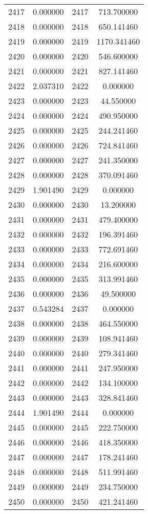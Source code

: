 \documentclass[12pt]{article}
\begin{document}
\begin{longtable}{@{}cccc@{}}
2417 & 0.000000 & 2417 & 713.700000 \\
2418 & 0.000000 & 2418 & 650.141460 \\
2419 & 0.000000 & 2419 & 1170.341460 \\
2420 & 0.000000 & 2420 & 546.600000 \\
2421 & 0.000000 & 2421 & 827.141460 \\
2422 & 2.037310 & 2422 & 0.000000 \\
2423 & 0.000000 & 2423 & 44.550000 \\
2424 & 0.000000 & 2424 & 490.950000 \\
2425 & 0.000000 & 2425 & 244.241460 \\
2426 & 0.000000 & 2426 & 724.841460 \\
2427 & 0.000000 & 2427 & 241.350000 \\
2428 & 0.000000 & 2428 & 370.091460 \\
2429 & 1.901490 & 2429 & 0.000000 \\
2430 & 0.000000 & 2430 & 13.200000 \\
2431 & 0.000000 & 2431 & 479.400000 \\
2432 & 0.000000 & 2432 & 196.391460 \\
2433 & 0.000000 & 2433 & 772.691460 \\
2434 & 0.000000 & 2434 & 216.600000 \\
2435 & 0.000000 & 2435 & 313.991460 \\
2436 & 0.000000 & 2436 & 49.500000 \\
2437 & 0.543284 & 2437 & 0.000000 \\
2438 & 0.000000 & 2438 & 464.550000 \\
2439 & 0.000000 & 2439 & 108.941460 \\
2440 & 0.000000 & 2440 & 279.341460 \\
2441 & 0.000000 & 2441 & 247.950000 \\
2442 & 0.000000 & 2442 & 134.100000 \\
2443 & 0.000000 & 2443 & 328.841460 \\
2444 & 1.901490 & 2444 & 0.000000 \\
2445 & 0.000000 & 2445 & 222.750000 \\
2446 & 0.000000 & 2446 & 418.350000 \\
2447 & 0.000000 & 2447 & 178.241460 \\
2448 & 0.000000 & 2448 & 511.991460 \\
2449 & 0.000000 & 2449 & 234.750000 \\
2450 & 0.000000 & 2450 & 421.241460 \\

\end{longtable}
\end{document}
